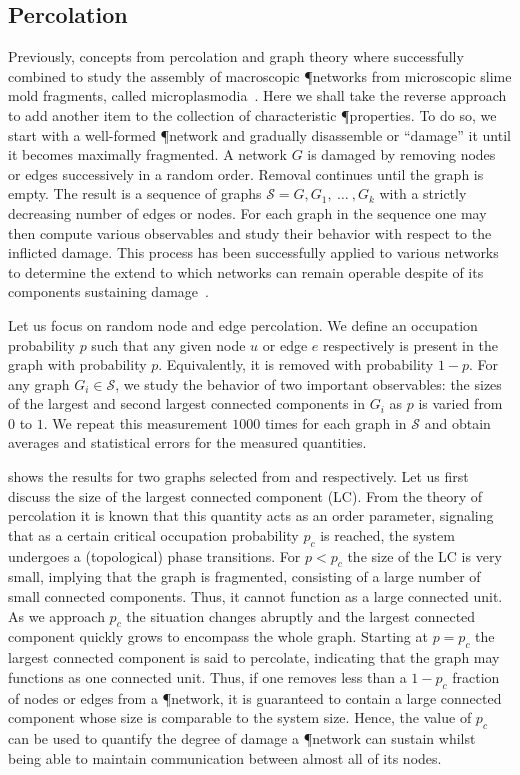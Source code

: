 	\subsection{Percolation}

		Previously, concepts from percolation and graph theory where successfully combined to study the assembly of macroscopic \P networks from microscopic slime mold fragments, called microplasmodia~\cite{fessel2012physarum,fessel2014analytical,fessel2015structuring}. Here we shall take the reverse approach to add another item to the collection of characteristic \P properties. To do so, we start with a well-formed \P network and gradually disassemble or ``damage'' it until it becomes maximally fragmented. A network $G$ is damaged by removing nodes or edges successively in a random order. Removal continues until the graph is empty. The result is a sequence of graphs $\mathcal{S} = {G,G_1, \ \dots \ , G_k}$ with a strictly decreasing number of edges or nodes. For each graph in the sequence one may then compute various observables and study their behavior with respect to the inflicted damage. This process has been successfully applied to various networks to determine the extend to which networks can remain operable despite of its components sustaining damage~\cite{callaway2000network,carlson2002complexity}. 

		Let us focus on random node and edge percolation. We define an occupation probability $p$ such that any given node $u$ or edge $e$ respectively is present in the graph with probability $p$. Equivalently, it is removed with probability $1-p$. For any graph $G_i \in \mathcal{S} $, we study the behavior of two important observables: the sizes of the largest and second largest connected components in $G_i$ as $p$ is varied from $0$ to $1$. We repeat this measurement $1000$ times for each graph in $\mathcal{S}$ and obtain averages and statistical errors for the measured quantities. 

		 shows the results for two graphs selected from  and  respectively. Let us first discuss the size of the largest connected component (LC). From the theory of percolation it is known that this quantity acts as an order parameter, signaling that as a certain critical occupation probability $p_c$ is reached, the system undergoes a (topological) phase transitions. For $p < p_c$ the size of the LC is very small, implying that the graph is fragmented, consisting of a large number of small connected components. Thus, it cannot function as a large connected unit. As we approach $p_c$ the situation changes abruptly and the largest connected component quickly grows to encompass the whole graph. Starting at $p=p_c$ the largest connected component is said to percolate, indicating that the graph may functions as one connected unit. Thus, if one removes less than a $1-p_c$ fraction of nodes or edges from a \P network, it is guaranteed to contain a large connected component whose size is comparable to the system size. Hence, the value of $p_c$ can be used to quantify the degree of damage a \P network can sustain whilst being able to maintain communication between almost all of its nodes.  

